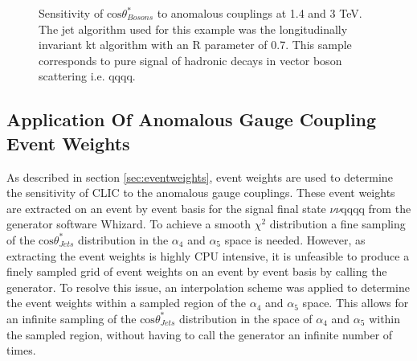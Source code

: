 \begin{figure}
\caption[Sensitivity of $\text{cos}\theta^{8}_{Bosons}$ to the anomalous gauge couplings $\alpha_{4}$ and $\alpha_{5}$ at 1.4 and 3 TeV.]{Sensitivity of $\text{cos}\theta^{*}_{Bosons}$ to anomalous couplings at 1.4 and 3 TeV. The jet algorithm used for this example was the longitudinally invariant kt algorithm with an R parameter of 0.7. This sample corresponds to pure signal of hadronic decays in vector boson scattering i.e. \nu{\nu}qqqq.}
\label{fig:costhetastarbosons}
\end{figure}


\subsection{Application Of Anomalous Gauge Coupling Event Weights}
\label{sec:eventweightsinterpolation}
As described in section \ref{sec:eventweights}, event weights are used to determine the sensitivity of CLIC to the anomalous gauge couplings.  These event weights are extracted on an event by event basis for the signal final state $\nu\nu\text{qqqq}$ from the generator software Whizard.  To achieve a smooth $\chi^{2}$ distribution a fine sampling of the $\text{cos}\theta^{*}_{Jets}$ distribution in the $\alpha_{4}$ and $\alpha_{5}$ space is needed.  However, as extracting the event weights is highly CPU intensive, it is unfeasible to produce a finely sampled grid of event weights on an event by event basis by calling the generator.  To resolve this issue, an interpolation scheme was applied to determine the event weights within a sampled region of the $\alpha_{4}$ and $\alpha_{5}$ space.  This allows for an infinite sampling of the $\text{cos}\theta^{*}_{Jets}$ distribution in the space of $\alpha_{4}$ and $\alpha_{5}$ within the sampled region, without having to call the generator an infinite number of times.

